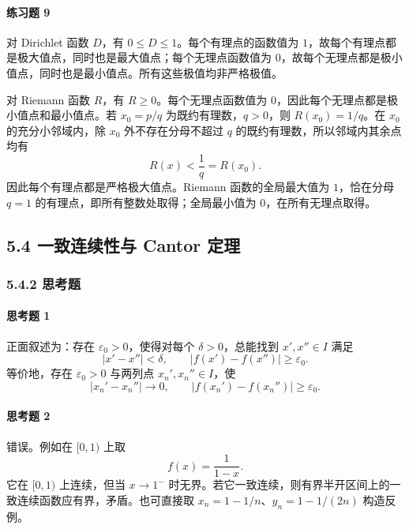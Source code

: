 \paragraph{练习题 9}
\begin{xsolution}
对 Dirichlet 函数 $D$，有 $0\le D\le1$。每个有理点的函数值为 $1$，故每个有理点都是极大值点，同时也是最大值点；每个无理点函数值为 $0$，故每个无理点都是极小值点，同时也是最小值点。所有这些极值均非严格极值。

对 Riemann 函数 $R$，有 $R\ge0$。每个无理点函数值为 $0$，因此每个无理点都是极小值点和最小值点。若 $x_0=p/q$ 为既约有理数，$q>0$，则 $R(x_0)=1/q$。在 $x_0$ 的充分小邻域内，除 $x_0$ 外不存在分母不超过 $q$ 的既约有理数，所以邻域内其余点均有
\[
 R(x)<\frac1q=R(x_0).
\]
因此每个有理点都是严格极大值点。Riemann 函数的全局最大值为 $1$，恰在分母 $q=1$ 的有理点，即所有整数处取得；全局最小值为 $0$，在所有无理点取得。
\end{xsolution}

\subsection*{5.4 一致连续性与 Cantor 定理}

\subsubsection*{5.4.2 思考题}

\paragraph{思考题 1}
\begin{xsolution}
正面叙述为：存在 $\varepsilon_0>0$，使得对每个 $\delta>0$，总能找到 $x',x''\in I$ 满足
\[
 |x'-x''|<\delta,
 \qquad
 |f(x')-f(x'')|\ge\varepsilon_0.
\]
等价地，存在 $\varepsilon_0>0$ 与两列点 $x_n',x_n''\in I$，使
\[
 |x_n'-x_n''|\to0,
 \qquad
 |f(x_n')-f(x_n'')|\ge\varepsilon_0.
\]
\end{xsolution}

\paragraph{思考题 2}
\begin{xsolution}
错误。例如在 $[0,1)$ 上取
\[
 f(x)=\frac1{1-x}.
\]
它在 $[0,1)$ 上连续，但当 $x\to1^-$ 时无界。若它一致连续，则有界半开区间上的一致连续函数应有界，矛盾。也可直接取 $x_n=1-1/n$、$y_n=1-1/(2n)$ 构造反例。
\end{xsolution}

